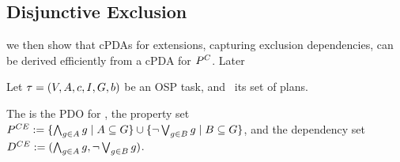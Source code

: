 \subsection{Disjunctive Exclusion}
\label{goaldep:disjunctive}





we then show
that cPDAs for extensions, capturing exclusion dependencies, can be
derived efficiently from a cPDA for $P^{C}$. Later


\begin{definition}
Let $\tau =
(V,\allowbreak A,\allowbreak{\ensuremath{c}},\allowbreak I,\allowbreak G,\allowbreak{\ensuremath{b}})$
be an OSP task, and \plans\ its set of plans.  

The  is the PDO for
\plans, the property set $P^{CE} := \{\bigwedge_{g \in A} g \mid
A \subseteq G\} \cup \{\neg \bigvee_{g \in B} g \mid B \subseteq G\}$,
and the dependency set $D^{CE} := (\bigwedge_{g \in A} g,\neg
\bigvee_{g \in B} g)$.
\end{definition}



































